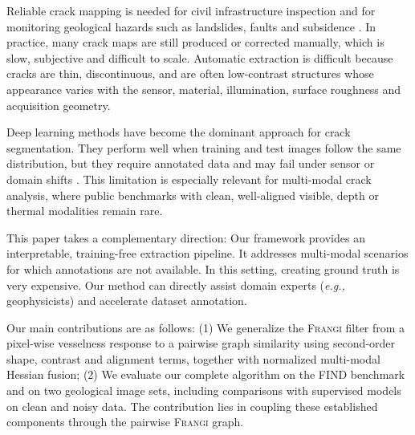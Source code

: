 \documentclass[conference,a4paper]{IEEEtran}
\newcommand{\eg}{\textit{e.g., }}
\newcommand{\Frangi}{\textnormal{\textsc{Frangi}}}
\begin{document}
Reliable crack mapping is needed for civil infrastructure inspection and for monitoring geological hazards such as landslides, faults and subsidence \cite{bird2016coastal}. In practice, many crack maps are still produced or corrected manually, which is slow, subjective and difficult to scale. Automatic extraction is difficult because cracks are thin, discontinuous, and are often low-contrast structures whose appearance varies with the sensor, material, illumination, surface roughness and acquisition geometry.

Deep learning methods have become the dominant approach for crack segmentation. They perform well when training and test images follow the same distribution, but they require annotated data and may fail under sensor or domain shifts \cite{JosianeGANCrack2020,SOTACrack2020, Zhang2025Review}. 
This limitation is especially relevant for multi-modal crack analysis, where public benchmarks with clean, well-aligned visible, depth or thermal modalities remain rare.


This paper takes a complementary direction: %
Our framework provides an interpretable, training-free extraction pipeline. It addresses multi-modal scenarios for which annotations are not available. In this setting, creating ground truth is very expensive.
Our method can directly assist domain experts (\eg geophysicists) and accelerate dataset annotation.



Our main contributions are as follows: 
(1) We generalize the \Frangi{} filter \cite{Frangi1998} from a pixel-wise vesselness response to a pairwise graph similarity using second-order shape, contrast and alignment terms, together with normalized multi-modal Hessian fusion;
(2) We evaluate our complete algorithm on the FIND benchmark \cite{FIND2022} and on two geological image sets, including comparisons with supervised models on clean and noisy data.
The contribution lies in coupling these established components through the pairwise \Frangi{} graph.
\end{document}
